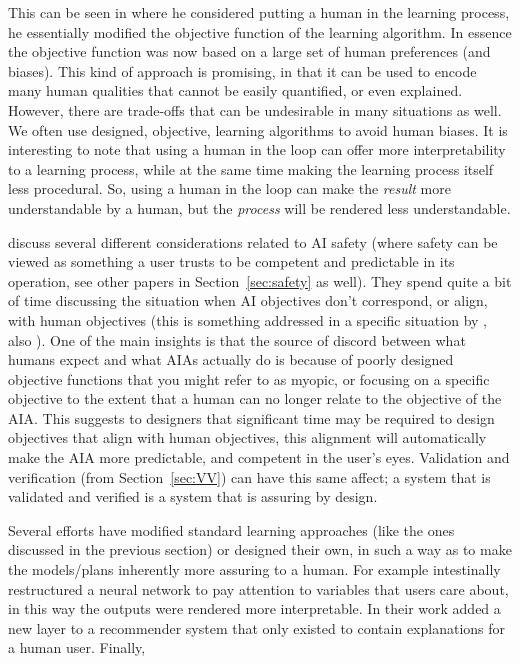     This can be seen in \citet{Freitas2006-qo} where he considered putting a human in the learning process, he essentially modified the objective function of the learning algorithm. In essence the objective function was now based on a large set of human preferences (and biases). This kind of approach is promising, in that it can be used to encode many human qualities that cannot be easily quantified, or even explained. However, there are trade-offs that can be undesirable in many situations as well. We often use designed, objective, learning algorithms to avoid human biases. It is interesting to note that using a human in the loop can offer more interpretability to a learning process, while at the same time making the learning process itself less procedural. So, using a human in the loop can make the \emph{result} more understandable by a human, but the \emph{process} will be rendered less understandable.

    \citet{Amodei2016-xi} discuss several different considerations related to AI safety (where safety can be viewed as something a user trusts to be competent and predictable in its operation, see other papers in Section~\ref{sec:safety} as well). They spend quite a bit of time discussing the situation when AI objectives don't correspond, or align, with human objectives (this is something addressed in a specific situation by \cite{Hadfield-Menell2016-ws}, also \cite{Bostrom2012-uf}). One of the main insights is that the source of discord between what humans expect and what AIAs actually do is because of poorly designed objective functions that you might refer to as myopic, or focusing on a specific objective to the extent that a human can no longer relate to the objective of the AIA. This suggests to designers that significant time may be required to design objectives that align with human objectives, this alignment will automatically make the AIA more predictable, and competent in the user's eyes. Validation and verification (from Section~\ref{sec:VV}) can have this same affect; a system that is validated and verified is a system that is assuring by design.

    Several efforts have modified standard learning approaches (like the ones discussed in the previous section) or designed their own, in such a way as to make the models/plans inherently more assuring to a human. For example \cite{Choi2016-by} intestinally restructured a neural network to pay attention to variables that users care about, in this way the outputs were rendered more interpretable. In their work \cite{Abdollahi2016-vn} added a new layer to a recommender system that only existed to contain explanations for a human user. Finally, \cite{Jovanovic2016-gw,Swartout1983-ko} 

